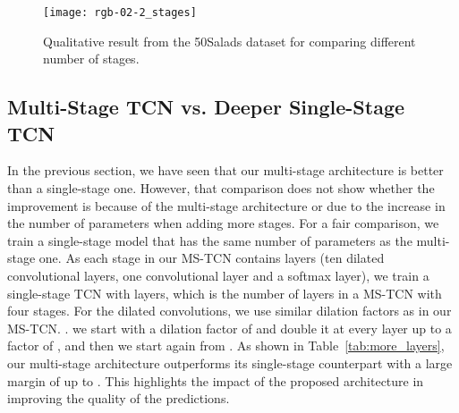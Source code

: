 \documentclass[10pt,twocolumn,letterpaper]{article}
\begin{document}
\begin{figure}[tb]
\begin{center}
   \texttt{[image: rgb-02-2\_stages]}
\end{center}
   \caption{Qualitative result from the 50Salads dataset for comparing different number of stages.}
\label{fig:qualitative_results_stages}
\end{figure}


\subsection{Multi-Stage TCN vs. Deeper Single-Stage TCN}

In the previous section, we have seen that our multi-stage architecture is 
better than a single-stage one. However, that comparison does not show whether 
the improvement is because of the multi-stage architecture or due to the increase 
in the number of parameters when adding more stages. For a fair comparison, we 
train a single-stage model that has the same number of parameters as the multi-stage one. 
As each stage in our MS-TCN contains  layers (ten dilated convolutional layers, one 
 convolutional layer and a softmax layer), we train a single-stage TCN with 
 layers, which is the number of layers in a MS-TCN with four stages. For the dilated convolutions, 
we use similar dilation factors as in our MS-TCN. \Ie. we start with a dilation factor 
of  and double it at every layer up to a factor of , and then we start again from 
. As shown in Table~\ref{tab:more_layers}, our multi-stage architecture outperforms 
its single-stage counterpart with a large margin of up to . This highlights the 
impact of the proposed architecture in improving the quality of the predictions.

\begin{table}[tb]
\centering
{}
\caption{Comparing a multi-stage TCN with a deep single-stage TCN on the 50Salads dataset.}
\label{tab:more_layers}
\end{table}
\end{document}
